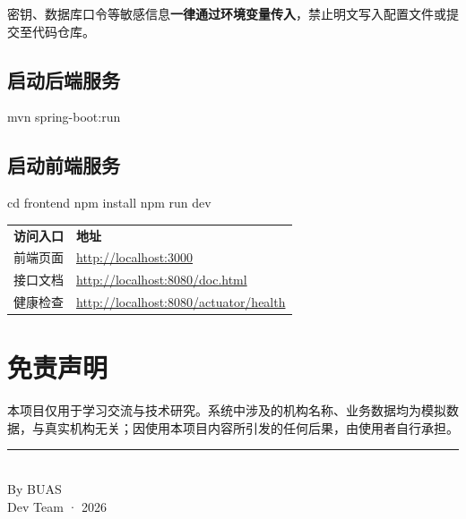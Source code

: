 \documentclass[11pt,a4paper,openany]{ctexrep}
\begin{document}
\begin{warnbox}
密钥、数据库口令等敏感信息\textbf{一律通过环境变量传入}，禁止明文写入配置文件或提交至代码仓库。
\end{warnbox}

\section{启动后端服务}
\begin{codebox}
mvn spring-boot:run
\end{codebox}

\section{启动前端服务}
\begin{codebox}
cd frontend
npm install
npm run dev
\end{codebox}

\begin{center}
\renewcommand{\arraystretch}{1.45}
\begin{tabular}{>{\raggedright\arraybackslash}p{4cm} >{\raggedright\arraybackslash}p{8cm}}
\rowcolor{table_head}\color{white}\textbf{访问入口} & \color{white}\textbf{地址}\\
前端页面 & \url{http://localhost:3000}\\
接口文档 & \url{http://localhost:8080/doc.html}\\
健康检查 & \url{http://localhost:8080/actuator/health}\\
\end{tabular}
\end{center}

\chapter{免责声明}

\begin{infobox}[声明]
本项目仅用于学习交流与技术研究。系统中涉及的机构名称、业务数据均为模拟数据，与真实机构无关；因使用本项目内容所引发的任何后果，由使用者自行承担。
\end{infobox}

\begin{center}
\vspace{400pt}
{\color{official_blue}\rule{0.4\textwidth}{1pt}}\\[10pt]
{\small\color{official_gray} By BUAS}\\[4pt]
{\footnotesize\color{official_gray!70} Dev Team · 2026}
\end{center}
\end{document}
